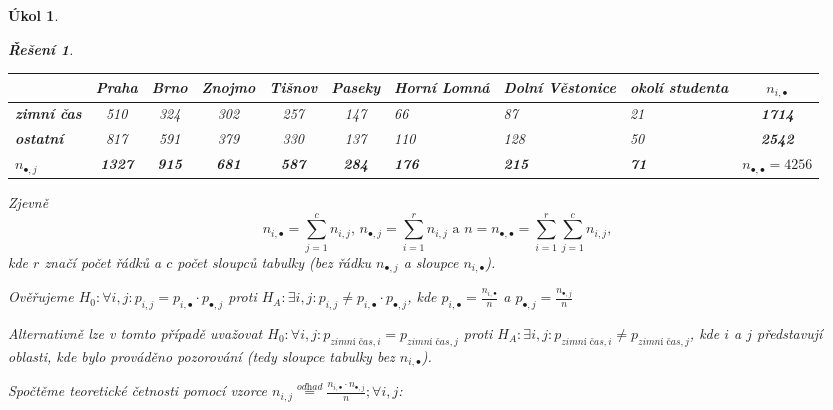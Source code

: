 \documentclass[11pt, a4paper]{article}
\theoremstyle{result}
\newtheorem*{result}{Řešení}
\newtheorem{task}{Úkol}
\begin{document}
\begin{task}
\begin{enumerate}[a)]
\begin{result}
            \begin{center}
                \begin{tabular}{ |l|c|c|c|c|c|M{1.5cm}|M{1.9cm}|M{1.8cm}|c| }
                    \hline
                    & \textbf{Praha} & \textbf{Brno} & \textbf{Znojmo} & \textbf{Tišnov} & \textbf{Paseky} & \textbf{Horní Lomná} & \textbf{Dolní Věstonice} & \textbf{okolí studenta} & \boldmath$n_{i, \bullet}$ \\
                    \hline
                    \textbf{zimní čas} & 510 & 324 & 302 & 257 & 147 & 66 & 87 & 21 & \textbf{1714} \\
                    \hline
                    \textbf{ostatní} & 817 & 591 & 379 & 330 & 137 & 110 & 128 & 50 & \textbf{2542} \\
                    \hline
                    \boldmath$n_{\bullet, j}$ & \textbf{1327} & \textbf{915} & \textbf{681} & \textbf{587} & \textbf{284} & \textbf{176} & \textbf{215} & \textbf{71} & \boldmath$n_{\bullet, \bullet} = 4256$ \\
                    \hline
                \end{tabular}
            \end{center}

            Zjevně
            $$n_{i, \bullet} = \sum_{j=1}^{c} n_{i, j}\text{, }n_{\bullet, j} = \sum_{i=1}^{r} n_{i, j}\text{ a } n = n_{\bullet, \bullet} = \sum_{i=1}^{r} \sum_{j=1}^{c} n_{i, j},$$
            kde $r$ značí počet řádků a $c$ počet sloupců tabulky (bez řádku $n_{\bullet, j}$ a sloupce $n_{i, \bullet}$).

            Ověřujeme $H_0: \forall i, j: p_{i, j} = p_{i, \bullet} \cdot p_{\bullet, j}$ proti $H_A: \exists i, j: p_{i, j} \neq p_{i, \bullet} \cdot p_{\bullet, j}$, kde $p_{i, \bullet} = \frac{n_{i, \bullet}}{n}$ a $p_{\bullet, j} = \frac{n_{\bullet, j}}{n}$

            Alternativně lze v tomto případě uvažovat $H_0: \forall i, j: p_{\textit{zimní čas}, i} = p_{\textit{zimní čas}, j}$ proti $H_A: \exists i, j: p_{\textit{zimní čas}, i} \neq p_{\textit{zimní čas}, j}$, kde $i$ a $j$ představují oblasti, kde bylo prováděno pozorování (tedy sloupce tabulky bez $n_{i, \bullet}$).

            Spočtěme teoretické četnosti pomocí vzorce $n_{i, j} \overset{\textit{odhad}}= \frac{n_{i, \bullet} \cdot n_{\bullet, j}}{n}; \forall i,j$:


\end{result}
\end{enumerate}
\end{task}
\end{document}
